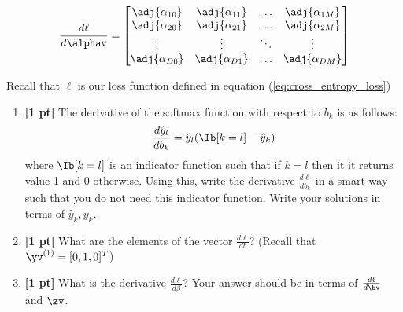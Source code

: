\begin{enumerate}
$$\frac{d\ell}{d\alphav} = 
    \begin{bmatrix}
        \adj{\alpha_{10}} & \adj{\alpha_{11}} & \dots  & \adj{\alpha_{1M}} \\
        \adj{\alpha_{20}} & \adj{\alpha_{21}} & \dots  & \adj{\alpha_{2M}} \\
        \vdots      & \vdots      & \ddots & \vdots \\
        \adj{\alpha_{D0}} & \adj{\alpha_{D1}} & \dots  & \adj{\alpha_{DM}}
    \end{bmatrix}$$




Recall that $\ell$ is our loss function defined in equation (\ref{eq:cross_entropy_loss})
    
    \begin{enumerate}
        \item \textbf{[1 pt]} The derivative of the softmax function with respect to $b_k$ is as follows:
        $$\frac{d\hat{y}_l}{db_k} = \hat{y}_l(\Ib[k=l]-\hat{y}_k)$$ 
        where $\Ib[k=l]$ is an indicator function such that if $k=l$ then it it returns value 1 and 0 otherwise. 
        Using this, write the derivative $\frac{d\ell}{db_k}$ in a smart way such that you do not need this indicator function. Write your solutions in terms of $\hat{y}_k,y_k$.
        
        
        \begin{tcolorbox}[fit,height=2cm, width=12cm, blank, borderline={1pt}{-2pt}]
        \end{tcolorbox}
        
        
        \item \textbf{[1 pt]} What are the elements of the vector $\frac{d\ell}{db}$? (Recall that  $\yv^{(1)}=[0,1,0]^T$)
        
        
        \begin{tcolorbox}[fit,height=1cm, width=6cm, blank, borderline={1pt}{-2pt}]
        \end{tcolorbox}
        
        
        \item \textbf{[1 pt]} What is the derivative $\frac{d\ell}{d\beta}$? Your answer should be in terms of $\frac{d\ell}{d\bv}$ and $\zv$.
        
        
        \begin{tcolorbox}[fit,height=3cm, width=12cm, blank, borderline={1pt}{-2pt}]
        \end{tcolorbox}
        

\end{enumerate}
\end{enumerate}
